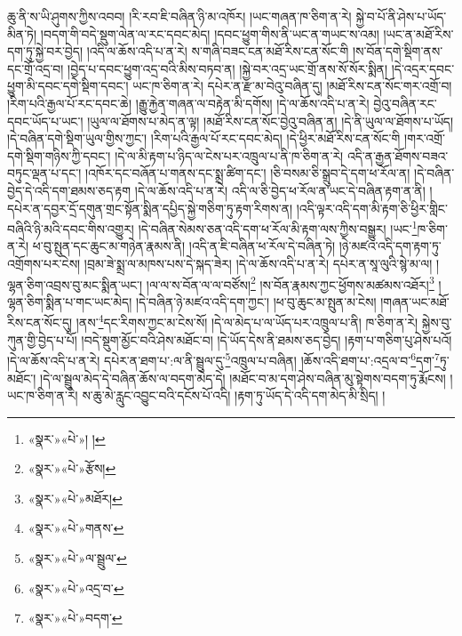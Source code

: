 ཆུ་ནི་ས་ཡི་ཤུགས་ཀྱིས་འབབ། །རི་རབ་ཇི་བཞིན་ཉི་མ་འཁོར། །ཡང་གཞན་ཁ་ཅིག་ན་རེ། སྐྱེ་བ་པོ་ནི་ཤེས་པ་ཡོད་མིན་ཏེ། །བདག་གི་བདེ་སྡུག་ལེན་ལ་རང་དབང་མེད། །དབང་ཕྱུག་གིས་ནི་ཡང་ན་གཡང་ས་འམ། །ཡང་ན་མཐོ་རིས་དག་ཏུ་སྐྱེ་བར་བྱེད། །འདི་ལ་ཆོས་འདི་པ་ན་རེ། ས་གཞི་བཟང་ངན་མཐོ་རིས་ངན་སོང་གི །ས་བོན་དགེ་སྡིག་ནས་དང་གྲོ་འདྲ་བ། །བྱེད་པ་དབང་ཕྱུག་འདྲ་བའི་མིས་བཏབ་ན། །སྐྱེ་བར་འདྲ་ཡང་གྲོ་ནས་སོ་སོར་སྨིན། །དེ་འདྲར་དབང་ཕྱུག་མི་དབང་དགེ་སྡིག་དབང་། ཡང་ཁ་ཅིག་ན་རེ། དཔེར་ན་རྫ་མ་བེའུ་བཞིན་དུ། །མཐོ་རིས་ངན་སོང་གར་འགྲོ་བ། །རིག་པའི་རྒྱལ་པོ་རང་དབང་ཆེ། །རྒྱུ་རྐྱེན་གཞན་ལ་བརྟེན་མི་དགོས། །དེ་ལ་ཆོས་འདི་པ་ན་རེ། བྱེའུ་བཞིན་རང་དབང་ཡོད་པ་ཡང་། །ཡུལ་ལ་ཐོགས་པ་མེད་ན་ལྟ། །མཐོ་རིས་ངན་སོང་བྱེའུ་བཞིན་ན། །དེ་ནི་ཡུལ་ལ་ཐོགས་པ་ཡོད། །དེ་བཞིན་དགེ་སྡིག་ཡུལ་གྱིས་ཀྱང་། །རིག་པའི་རྒྱལ་པོ་རང་དབང་མེད། །དེ་ཕྱིར་མཐོ་རིས་ངན་སོང་གི །གར་འགྲོ་དགེ་སྡིག་གཉིས་ཀྱི་དབང་། །དེ་ལ་མི་རྟག་པ་ཉིད་ལ་ངེས་པར་འཁྲུལ་པ་ནི་ཁ་ཅིག་ན་རེ། འདི་ན་རྒྱན་ཐོགས་བཟའ་བཏུང་ལྡན་པ་དང་། །འཁོར་དང་བཞོན་པ་གནས་དང་སྨྲ་ཚིག་དང་། །ཅི་བསམ་ཅི་སྒྲུབ་དེ་དག་ཕ་རོལ་ན། །དེ་བཞིན་བྱེད་དེ་འདི་དག་ཐམས་ཅད་རྟག །དེ་ལ་ཆོས་འདི་པ་ན་རེ། འདི་ལ་ཅི་བྱེད་ཕ་རོལ་ན་ཡང་དེ་བཞིན་རྟག་ན་ནི། །དཔེར་ན་དབྱར་དྲོ་དགུན་གྲང་སྟོན་སྨིན་དཔྱིད་སྐྱེ་གཅིག་ཏུ་རྟག་རིགས་ན། །འདི་ལྟར་འདི་དག་མི་རྟག་ཅི་ཕྱིར་གླིང་བཞིའི་ཉི་མའི་དབང་གིས་འགྱུར། །དེ་བཞིན་སེམས་ཅན་འདི་དག་ཕ་རོལ་མི་རྟག་ལས་ཀྱིས་བསྒྱུར། །ཡང་\footnote{«སྣར་»«པེ་»། །}ཁ་ཅིག་ན་རེ། ཕ་བུ་སྤུན་དང་ཆུང་མ་གཉེན་རྣམས་ནི། །འདི་ན་ཇི་བཞིན་ཕ་རོལ་དེ་བཞིན་ཏེ། །ཉེ་མཛའ་འདི་དག་རྟག་ཏུ་འགྲོགས་པར་ངེས། །བྲམ་ཟེ་སྨྲ་ལ་མཁས་པས་དེ་སྐད་ཟེར། །དེ་ལ་ཆོས་འདི་པ་ན་རེ། དཔེར་ན་སཱ་ལུའི་སྙེ་མ་ལ། །ལྷན་ཅིག་འབྲས་བུ་མང་སྨིན་ཡང་། །ལ་ལ་ས་བོན་ལ་ལ་བཙོས།\footnote{«སྣར་»«པེ་»རྩོས།} །ས་བོན་རྣམས་ཀྱང་ཕྱོགས་མཚམས་འཐོར།\footnote{«སྣར་»«པེ་»མཐོར།} །ལྷན་ཅིག་སྨིན་པ་གང་ཡང་མེད། །དེ་བཞིན་ཉེ་མཛའ་འདི་དག་ཀྱང་། །ཕ་བུ་ཆུང་མ་སྤུན་མ་ངེས། །གཞན་ཡང་མཐོ་རིས་ངན་སོང་དུ། །ནས་\footnote{«སྣར་»«པེ་»གནས་}དང་རིགས་ཀྱང་མ་ངེས་སོ། །དེ་ལ་མེད་པ་ལ་ཡོད་པར་འཁྲུལ་པ་ནི། ཁ་ཅིག་ན་རེ། སྐྱེས་བུ་ཀུན་གྱི་བྱེད་པ་པོ། །བདེ་སྡུག་མྱོང་བའི་ཤེས་མཐོང་བ། །དེ་ཡོད་དེས་ནི་ཐམས་ཅད་བྱེད། །རྟག་པ་གཅིག་པུ་ཤེས་པའོ། །དེ་ལ་ཆོས་འདི་པ་ན་རེ། དཔེར་ན་ཐག་པ་:ལ་ནི་སྦྲུལ་དུ་\footnote{«སྣར་»«པེ་»ལ་སྦྲུལ་}འཁྲུལ་པ་བཞིན། །ཆོས་འདི་ཐག་པ་:འདྲལ་བ་\footnote{«སྣར་»«པེ་»འདྲ་བ་}དག་\footnote{«སྣར་»«པེ་»བདག་}ཏུ་མཐོང་། །དེ་ལ་སྦྲུལ་མེད་དེ་བཞིན་ཆོས་ལ་བདག་མེད་དེ། །མཐོང་བ་མ་དག་ཤེས་བཞིན་མུ་སྟེགས་བདག་ཏུ་རྨོངས། །ཡང་ཁ་ཅིག་ན་རེ། ས་ཆུ་མེ་རླུང་འབྱུང་བའི་དངོས་པོ་འདི། །རྟག་ཏུ་ཡོད་དེ་འདི་དག་མེད་མི་སྲིད། །

